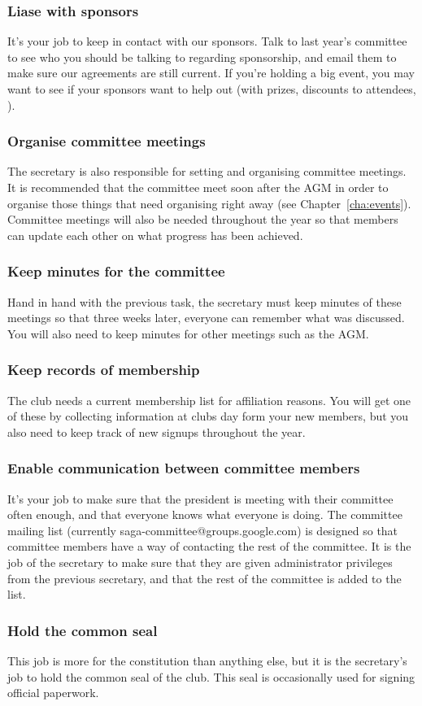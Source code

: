 \subsubsection{Liase with sponsors}

It's your job to keep in contact with our sponsors. Talk to last year's committee to see who you should be talking to regarding sponsorship, and email them to make sure our agreements are still current. If you're holding a big event, you may want to see if your sponsors want to help out (with prizes, discounts to attendees, \etc).

\subsubsection{Organise committee meetings}

The secretary is also responsible for setting and organising committee meetings. It is recommended that the committee meet soon after the AGM in order to organise those things that need organising right away (see Chapter~\ref{cha:events}). Committee meetings will also be needed throughout the year so that members can update each other on what progress has been achieved.

\subsubsection{Keep minutes for the committee}

Hand in hand with the previous task, the secretary must keep minutes of these meetings so that three weeks later, everyone can remember what was discussed. You will also need to keep minutes for other meetings such as the AGM.

\subsubsection{Keep records of membership}

The club needs a current membership list for affiliation reasons. You will get one of these by collecting information at clubs day form your new members, but you also need to keep track of new signups throughout the year.

\subsubsection{Enable communication between committee members}

It's your job to make sure that the president is meeting with their committee often enough, and that everyone knows what everyone is doing. The committee mailing list (currently saga-committee@groups.google.com) is designed so that committee members have a way of contacting the rest of the committee. It is the job of the secretary to make sure that they are given administrator privileges from the previous secretary, and that the rest of the committee is added to the list.

\subsubsection{Hold the common seal}

This job is more for the constitution than anything else, but it is the secretary's job to hold the common seal of the club. This seal is occasionally used for signing official paperwork.